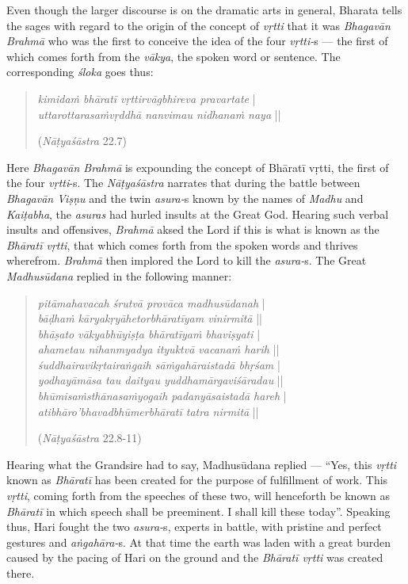 Even though the larger discourse is on the dramatic arts in general, Bharata tells the sages with regard to the origin of the concept of \textsl{vṛtti} that it was \textsl{Bhagavān Brahmā} who was the first to conceive the idea of the four \textsl{vṛtti-}s --- the first of which comes forth from the \textsl{vākya}, the spoken word or sentence. The corresponding \textsl{śloka} goes thus:
\begin{quote}
\textsl{kimidaṁ bhāratī vṛttirvāgbhireva pravartate} |  \\
\textsl{uttarottarasaṁvṛddhā nanvimau nidhanaṁ naya} || 

\hfill(\textsl{Nāṭyaśāstra} 22.7)
\end{quote}

Here \textsl{Bhagavān Brahmā} is expounding the concept of Bhāratī vṛtti, the first of the four \textsl{vṛtti}-s. The \textsl{Nāṭyaśāstra} narrates that during the battle between \textsl{Bhagavān Viṣṇu} and the twin \textsl{asura-}s known by the names of \textsl{Madhu} and \textsl{Kaiṭabha}, the \textsl{asuras} had hurled insults at the Great God. Hearing such verbal insults and offensives, \textsl{Brahmā} aksed the Lord if this is what is known as the \textsl{Bhāratī vṛtti}, that which comes forth from the spoken words and thrives wherefrom. \textsl{Brahmā} then implored the Lord to kill the \textsl{asura-}s. The Great \textsl{Madhusūdana} replied in the following manner:
\begin{quote}
\textsl{pitāmahavacah śrutvā provāca madhusūdanah} |\\
\textsl{bāḍhaṁ kāryakṛyāhetorbhāratīyam vinirmitā} ||\\
\textsl{bhāṣato vākyabhūyiṣṭa bhāratīyaṁ bhaviṣyati} |\\
\textsl{ahametau nihanmyadya ityuktvā vacanaṁ harih} ||\\
\textsl{śuddhairavikṛtairaṅgaih sāṁgahāraistadā bhṛśam} |\\
\textsl{yodhayāmāsa tau daityau yuddhamārgaviśāradau} ||\\
\textsl{bhūmisaṁsthānasaṁyogaih padanyāsaistadā hareh} |\\
\textsl{atibhāro’bhavadbhūmerbhāratī tatra nirmitā} ||

\hfill (\textsl{Nāṭyaśāstra} 22.8-11)
\end{quote}

Hearing what the Grandsire had to say, Madhusūdana replied --- “Yes, this \textsl{vṛtti} known as \textsl{Bhāratī} has been created for the purpose of fulfillment of work. This \textsl{vṛtti}, coming forth from the speeches of these two, will henceforth be known as \textsl{Bhāratī} in which speech shall be preeminent. I shall kill these today”. Speaking thus, Hari fought the two \textsl{asura-}s, experts in battle, with pristine and perfect gestures and \textsl{aṅgahāra-}s. At that time the earth was laden with a great burden caused by the pacing of Hari on the ground and the \textsl{Bhāratī vṛtti} was created there. 

